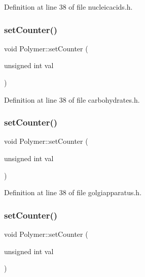 Definition at line 38 of file nucleicacids.\+h.

\mbox{\label{class_polymer_a7ed6bbe09a570b59f9253d63fd3326d2}} 
\subsubsection{\texorpdfstring{set\+Counter()}{setCounter()}\hspace{0.1cm}{\footnotesize\ttfamily [8/10]}}
{\footnotesize\ttfamily void Polymer\+::set\+Counter (\begin{DoxyParamCaption}\item[{unsigned int}]{val }\end{DoxyParamCaption})\hspace{0.3cm}{\ttfamily [inline]}}



Definition at line 38 of file carbohydrates.\+h.

\mbox{\label{class_polymer_a7ed6bbe09a570b59f9253d63fd3326d2}} 
\subsubsection{\texorpdfstring{set\+Counter()}{setCounter()}\hspace{0.1cm}{\footnotesize\ttfamily [9/10]}}
{\footnotesize\ttfamily void Polymer\+::set\+Counter (\begin{DoxyParamCaption}\item[{unsigned int}]{val }\end{DoxyParamCaption})\hspace{0.3cm}{\ttfamily [inline]}}



Definition at line 38 of file golgiapparatus.\+h.

\mbox{\label{class_polymer_a7ed6bbe09a570b59f9253d63fd3326d2}} 
\subsubsection{\texorpdfstring{set\+Counter()}{setCounter()}\hspace{0.1cm}{\footnotesize\ttfamily [10/10]}}
{\footnotesize\ttfamily void Polymer\+::set\+Counter (\begin{DoxyParamCaption}\item[{unsigned int}]{val }\end{DoxyParamCaption})\hspace{0.3cm}{\ttfamily [inline]}}



